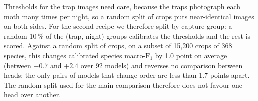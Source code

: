 Thresholds for the trap images need care, because the traps photograph each moth many times per night, so a random split of crops puts near-identical images on both sides.
For the second recipe we therefore split by capture group: a random 10\,\% of the (trap, night) groups calibrates the thresholds and the rest is scored.
Against a random split of crops, on a subset of 15,200 crops of 368 species, this changes calibrated species macro-$\text{F}_1$ by 1.0 point on average (between $-0.7$ and $+2.4$ over 92 models) and reverses no comparison between heads; the only pairs of models that change order are less than 1.7 points apart.
The random split used for the main comparison therefore does not favour one head over another.
